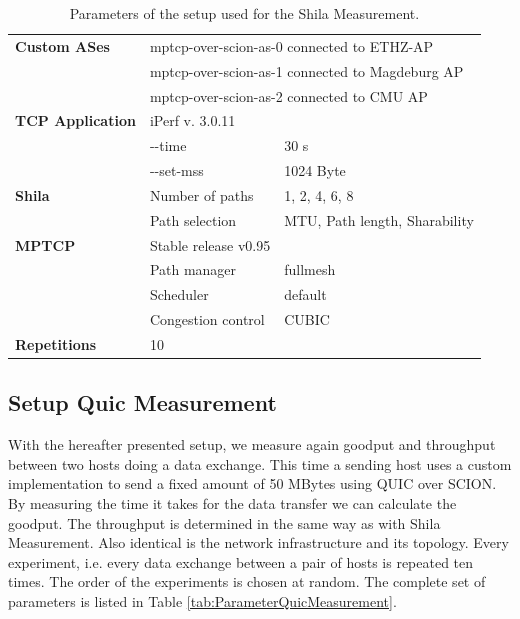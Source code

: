 \begin{table} [H]
	\centering
	\begin{tabular}{lll} 
		\toprule
		\textbf{Custom ASes} 		& \multicolumn{2}{l}{mptcp-over-scion-as-0 connected to ETHZ-AP}				\\
							 		& \multicolumn{2}{l}{mptcp-over-scion-as-1 connected to Magdeburg AP}			\\
							 		& \multicolumn{2}{l}{mptcp-over-scion-as-2 connected to CMU AP}					\smallskip \\ 
		\textbf{TCP Application}	& iPerf v. 3.0.11								&								\\
									& -\vspace{0 px}-time										& 30 s				\\
									& -\vspace{0 px}-set-mss										& 1024 Byte		\smallskip	\\
		\textbf{Shila}				&  Number of paths								& 1, 2, 4, 6, 8					\\
									& Path selection				 				& MTU, Path length, Sharability \smallskip\\
		\textbf{MPTCP}				& Stable release v0.95							&								\\
									& Path manager									& fullmesh						\\
									& Scheduler										& default						\\
									& Congestion control							& CUBIC							\smallskip\\
		\textbf{Repetitions} 		& 10  											&								\\
		\bottomrule
	\end{tabular}
	\label{tab:ParameterShilaMeasurement}
	\caption{Parameters of the setup used for the Shila Measurement.}
\end{table}

\subsection*{Setup Quic Measurement}

With the hereafter presented setup, we measure again goodput and throughput between two hosts doing a data exchange. This time a sending host uses a custom implementation to send a fixed amount of 50 MBytes using QUIC over SCION. By measuring the time it takes for the data transfer we can calculate the goodput. The throughput is determined in the same way as with Shila Measurement. Also identical is the network infrastructure and its topology. Every experiment, i.e. every data exchange between a pair of hosts is repeated ten times. The order of the experiments is chosen at random. The complete set of parameters is listed in Table \ref{tab:ParameterQuicMeasurement}.


